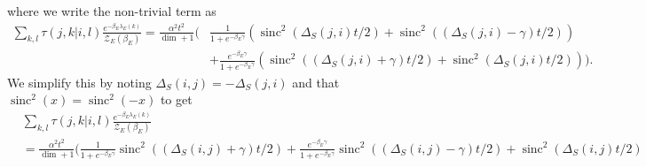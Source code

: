 \documentclass{article}
\newcommand{\partfun}{\mathcal{Z}}
\DeclareMathOperator{\sinc}{sinc}
\begin{document}
where we write the non-trivial term as
\begin{align}
    \sum_{k,l} \tau(j,k|i,l) \frac{e^{-\beta_E \lambda_E(k)}}{\partfun_E(\beta_E)} = \frac{\alpha^2 t^2}{\dim + 1} \bigg(&\frac{1}{1 + e^{-\beta_E \gamma}} (\sinc^2(\Delta_S(j,i)t/2) + \sinc^2((\Delta_S(j,i) - \gamma)t/2)) \nonumber \\
    &+\frac{e^{-\beta_E \gamma}}{1 + e^{-\beta_E \gamma}} (\sinc^2((\Delta_S(j,i) + \gamma)t/2) + \sinc^2(\Delta_S(j,i) t/2)) \bigg).
\end{align}
We simplify this by noting $\Delta_S(i,j) = - \Delta_S(j,i)$ and that $\sinc^2(x) = \sinc^2(-x)$ to get
\begin{align}
&\sum_{k,l} \tau(j,k|i,l) \frac{e^{-\beta_E \lambda_E(k)}}{\partfun_E(\beta_E)} \\
&= \frac{\alpha^2 t^2}{\dim + 1} \bigg(\frac{1}{1 + e^{-\beta_E \gamma}} \sinc^2((\Delta_S(i,j) + \gamma)t/2) + \frac{e^{-\beta_E \gamma}}{1 + e^{-\beta_E \gamma}} \sinc^2((\Delta_S(i,j) - \gamma)t/2) + \sinc^2(\Delta_S(i,j)t/2)
\end{align}
\end{document}
